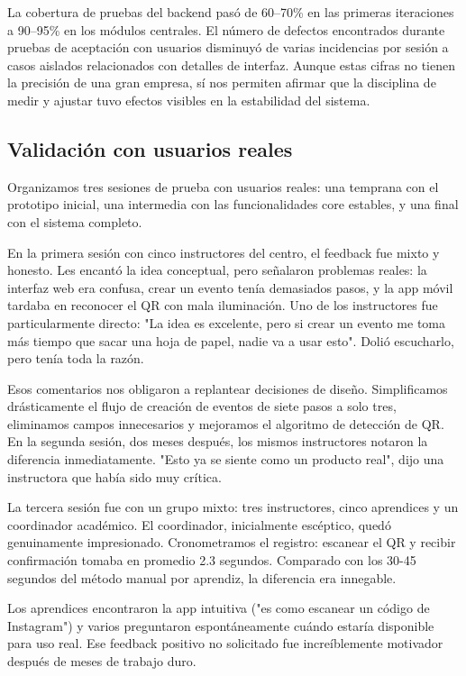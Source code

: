 La cobertura de pruebas del backend pasó de 60--70\% en las primeras iteraciones a 90--95\% en los módulos centrales. El número de defectos encontrados durante pruebas de aceptación con usuarios disminuyó de varias incidencias por sesión a casos aislados relacionados con detalles de interfaz. Aunque estas cifras no tienen la precisión de una gran empresa, sí nos permiten afirmar que la disciplina de medir y ajustar tuvo efectos visibles en la estabilidad del sistema.

\subsection{Validación con usuarios reales}

Organizamos tres sesiones de prueba con usuarios reales: una temprana con el prototipo inicial, una intermedia con las funcionalidades core estables, y una final con el sistema completo.

En la primera sesión con cinco instructores del centro, el feedback fue mixto y honesto. Les encantó la idea conceptual, pero señalaron problemas reales: la interfaz web era confusa, crear un evento tenía demasiados pasos, y la app móvil tardaba en reconocer el QR con mala iluminación. Uno de los instructores fue particularmente directo: "La idea es excelente, pero si crear un evento me toma más tiempo que sacar una hoja de papel, nadie va a usar esto". Dolió escucharlo, pero tenía toda la razón.

Esos comentarios nos obligaron a replantear decisiones de diseño. Simplificamos drásticamente el flujo de creación de eventos de siete pasos a solo tres, eliminamos campos innecesarios y mejoramos el algoritmo de detección de QR. En la segunda sesión, dos meses después, los mismos instructores notaron la diferencia inmediatamente. "Esto ya se siente como un producto real", dijo una instructora que había sido muy crítica.

La tercera sesión fue con un grupo mixto: tres instructores, cinco aprendices y un coordinador académico. El coordinador, inicialmente escéptico, quedó genuinamente impresionado. Cronometramos el registro: escanear el QR y recibir confirmación tomaba en promedio 2.3 segundos. Comparado con los 30-45 segundos del método manual por aprendiz, la diferencia era innegable.

Los aprendices encontraron la app intuitiva ("es como escanear un código de Instagram") y varios preguntaron espontáneamente cuándo estaría disponible para uso real. Ese feedback positivo no solicitado fue increíblemente motivador después de meses de trabajo duro.

